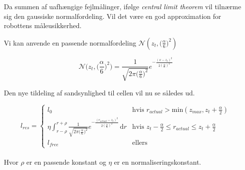 Da summen af uafhængige fejlmålinger, ifølge \emph{central limit theorem} vil tilnærme sig
den gaussiske normalfordeling. \cite[p. 223]{ArtificialIntelligence}
Vil det være en god approximation for robottens måleusikkerhed.


Vi kan anvende en passende normalfordeling $\mathcal{N}(z_t,\big(\frac{\alpha}{6}\big)^2)$ 




\begin{equation}
\mathcal{N}\bigg(z_t,\bigg(\frac{\alpha}{6}\bigg)^2\bigg) = 
\frac{1}{\sqrt{2 \pi \big(\frac{\alpha}{6}\big)^2}}e^{- \frac{(x - z_t)^2}{2 (\frac{\alpha}{6})^2}}
\end{equation}

Den nye tildeling af sandsynlighed til cellen vil nu se således ud.

\begin{equation}
l_{res} = \begin{cases} 
	l_0 &\text{hvis }r_{actual} > \text{min}(z_{max},z_t+\frac{\alpha}{2}) \\ 
	
	
	\eta \int_{r-\rho}^{r+\rho} \frac{1}{\sqrt{2 \pi \big(\frac{\alpha}{6}\big)^2}}e^{- \frac{(r_{actual} - z_t)^2}{2 (\frac{\alpha}{6})^2}}\, \mathrm{d}r
		&\text{hvis } z_t-\frac{\alpha}{2} \leq r_{actual} \leq z_t+\frac{\alpha}{2}\\ 

	l_{free} &\text{ellers}	
\end{cases}
\end{equation}
\\
Hvor $\rho$ er en passende konstant og $\eta$ er en normaliseringskonstant.






